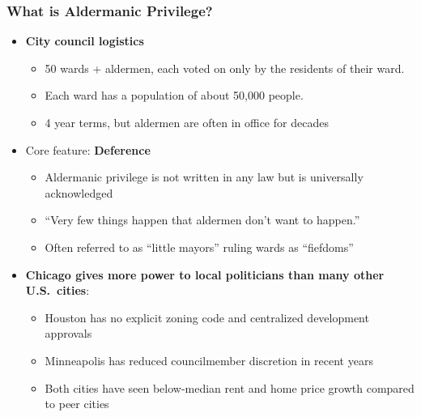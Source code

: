\begin{frame}
	\frametitle{What is Aldermanic Privilege?}
	\begin{itemize}
		\item \textbf{City council logistics}
		\begin{itemize}
			\item 50 wards + aldermen, each voted on only by the residents of their ward. 
			\item Each ward has a population of about 50,000 people.
			\item 4 year terms, but aldermen are often in office for decades 
		\end{itemize}
		\item Core feature: \textbf{Deference}
		\begin{itemize}
			\item Aldermanic privilege is not written in any law but is universally acknowledged
			\item ``Very few things happen that aldermen don't want to happen.'' \mbox{\scriptsize \citep{zhang_boundaries_2011}}
			\item Often referred to as ``little mayors'' ruling wards as ``fiefdoms''
		\end{itemize}
		\item \textbf{Chicago gives more power to local politicians than many other U.S.\ cities}: 
		\begin{itemize}
			\item Houston has no explicit zoning code and centralized development approvals
			\item Minneapolis has reduced councilmember discretion in recent years
			\item Both cities have seen below-median rent and home price growth compared to peer cities \cite{hembre_unpacking_2025,heckler_this_2026}
		\end{itemize}
	\end{itemize}
\end{frame}

